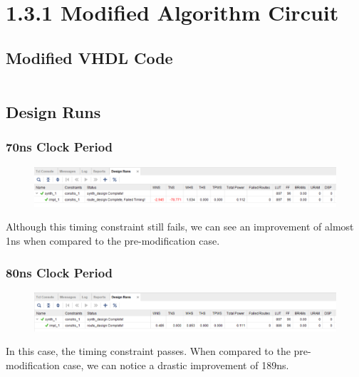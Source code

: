 \documentclass[11pt]{report}
\begin{document}
\section*{1.3.1 Modified Algorithm Circuit}
\subsection*{Modified VHDL Code}
\inputminted{vhdl}{../../Lab2/Lab2.srcs/}

\subsection*{Design Runs}
\subsubsection*{70ns Clock Period}
\begin{figure}[H]
    \includegraphics[width=\columnwidth]{Reports/Lab2/Waveforms/taskc_70ns_design-runs.png}
\end{figure}
Although this timing constraint still fails, we can see an improvement of almost 1ns when compared to the pre-modification case.

\subsubsection*{80ns Clock Period}
\begin{figure}[H]
    \includegraphics[width=\columnwidth]{Reports/Lab2/Waveforms/taskc_80ns_design-runs.png}
\end{figure}
In this case, the timing constraint passes. When compared to the pre-modification case, we can notice a drastic improvement of 189ns.
\end{document}
